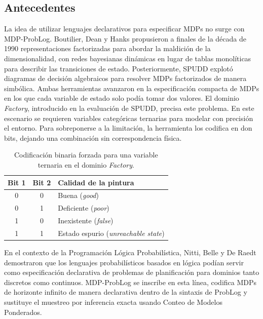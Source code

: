 \clearpage

\subsection{Antecedentes}
\label{sec:antecedentes}

La idea de utilizar lenguajes declarativos para especificar MDPs no surge con
MDP-ProbLog. Boutilier, Dean y Hanks \cite{boutilier1999decision} propusieron
a finales de la década de 1990 representaciones factorizadas para abordar la
maldición de la dimensionalidad, con redes bayesianas dinámicas en lugar de
tablas monolíticas para describir las transiciones de estado. Posteriormente,
SPUDD \cite{hoey1999spudd} explotó diagramas de decisión algebraicos para
resolver MDPs factorizados de manera simbólica. Ambas herramientas avanzaron en la especificación compacta de MDPs en los que cada variable de estado solo podía tomar dos valores. El dominio \textit{Factory}, introducido
en la evaluación de SPUDD, precisa este problema. En este escenario se requieren variables categóricas 
ternarias para modelar con precisión el entorno. Para sobreponerse a la limitación, la herramienta los
codifica en don bits, dejando una combinación sin correspondencia física.

\begin{table}[H]
\centering
\caption{Codificación binaria forzada para una variable ternaria en el dominio \textit{Factory}.}
\label{tab:spudd-espurios}
\small
\begin{tabular}{cc|l}
\toprule
\textbf{Bit 1} & \textbf{Bit 2} & \textbf{Calidad de la pintura} \\
\midrule
0 & 0 & Buena (\textit{good}) \\
0 & 1 & Deficiente (\textit{poor}) \\
1 & 0 & Inexistente (\textit{false}) \\
1 & 1 & Estado espurio (\textit{unreachable state}) \\
\bottomrule
\end{tabular}
\end{table}

En el contexto de la Programación Lógica Probabilística, Nitti, Belle y De
Raedt \cite{nitti2016planning} demostraron que los lenguajes probabilísticos
basados en lógica podían servir como especificación declarativa de problemas
de planificación para dominios tanto discretos como continuos. MDP-ProbLog
\cite{bueno2016mdp} se inscribe en esta línea, codifica MDPs de horizonte infinito de manera declarativa dentro de la sintaxis de ProbLog y sustituye el muestreo por inferencia exacta usando Conteo de Modelos Ponderados.

